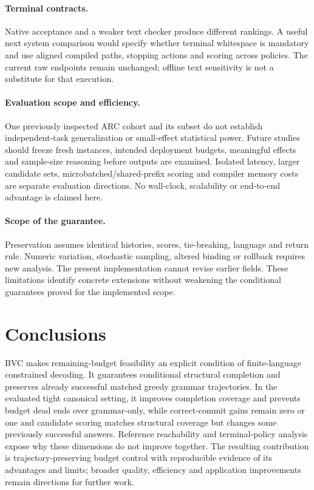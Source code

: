 \documentclass[12pt,a4paper]{article}
\begin{document}
\paragraph{Terminal contracts.} Native acceptance and a weaker text checker produce different rankings. A useful next system comparison would specify whether terminal whitespace is mandatory and use aligned compiled paths, stopping actions and scoring across policies. The current raw endpoints remain unchanged; offline text sensitivity is not a substitute for that execution.

\paragraph{Evaluation scope and efficiency.} One previously inspected ARC cohort and its subset do not establish independent-task generalization or small-effect statistical power. Future studies should freeze fresh instances, intended deployment budgets, meaningful effects and sample-size reasoning before outputs are examined. Isolated latency, larger candidate sets, microbatched/shared-prefix scoring and compiler memory costs are separate evaluation directions. No wall-clock, scalability or end-to-end advantage is claimed here.

\paragraph{Scope of the guarantee.} Preservation assumes identical histories, scores, tie-breaking, language and return rule. Numeric variation, stochastic sampling, altered binding or rollback requires new analysis. The present implementation cannot revise earlier fields. These limitations identify concrete extensions without weakening the conditional guarantees proved for the implemented scope.

\section{Conclusions}\label{sec:conclusions}
BVC makes remaining-budget feasibility an explicit condition of finite-language constrained decoding. It guarantees conditional structural completion and preserves already successful matched greedy grammar trajectories. In the evaluated tight canonical setting, it improves completion coverage and prevents budget dead ends over grammar-only, while correct-commit gains remain zero or one and candidate scoring matches structural coverage but changes some previously successful answers. Reference reachability and terminal-policy analysis expose why these dimensions do not improve together. The resulting contribution is trajectory-preserving budget control with reproducible evidence of its advantages and limits; broader quality, efficiency and application improvements remain directions for further work.
\end{document}
